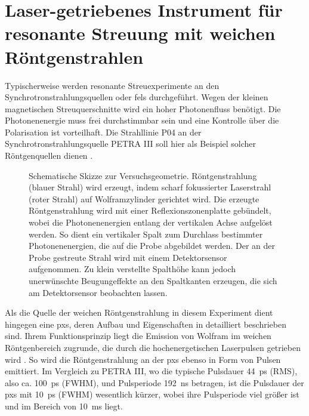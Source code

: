 \chapter{Laser-getriebenes Instrument für resonante Streuung mit weichen Röntgenstrahlen}
\label{text:quelle_roentgen}
Typischerweise werden resonante Streuexperimente an den Synchrotronstrahlungsquellen oder \gls{fel}s durchgeführt. Wegen der kleinen magnetischen Streuquerschnitte wird ein hoher Photonenfluss benötigt. Die Photonenenergie muss frei durchstimmbar sein und eine Kontrolle über die Polarisation ist vorteilhaft. Die Strahllinie P04 an der Synchrotronstrahlungsquelle PETRA III soll hier als Beispiel solcher Röntgenquellen dienen \cite{viefhaus_variable_2013}.
\begin{figure}[H]
    \centering
    
    \caption{Schematische Skizze zur Versuchsgeometrie. Röntgenstrahlung (blauer Strahl) wird erzeugt, indem scharf fokussierter Laserstrahl (roter Strahl) auf Wolframzylinder gerichtet wird. Die erzeugte Röntgenstrahlung wird mit einer Reflexionszonenplatte gebündelt, wobei die Photonenenergien entlang der vertikalen Achse aufgelöst werden. So dient ein vertikaler Spalt zum Durchlass bestimmter Photonenenergien, die auf die Probe abgebildet werden. Der an der Probe gestreute Strahl wird mit einem Detektorsensor aufgenommen. Zu klein verstellte Spalthöhe kann jedoch unerwünschte Beugungeffekte an den Spaltkanten erzeugen, die sich am Detektorsensor beobachten lassen.}
    \label{fig:pxs_aufbau}
\end{figure}
\noindent
Als die Quelle der weichen Röntgenstrahlung in diesem Experiment dient hingegen eine \gls{pxs}, deren Aufbau und Eigenschaften in \cite{schick_laser-driven_2021} detailliert beschrieben sind. Ihrem Funktionsprinzip liegt die Emission von Wolfram im weichen Röntgenbereich zugrunde, die durch die hochenergetischen Laserpulsen getrieben wird \cite{mantouvalou_high_2015}. So wird die Röntgenstrahlung an der \gls{pxs} ebenso in Form von Pulsen emittiert. Im Vergleich zu PETRA III, wo die typische Pulsdauer \SI{44}{\pico\second} (RMS), also ca. \SI{100}{\pico\second} (FWHM), und Pulsperiode \SI{192}{\nano\second}  betragen, ist die Pulsdauer der \gls{pxs} mit \SI{10}{\pico\second} (FWHM) wesentlich kürzer, wobei ihre Pulsperiode viel größer ist und im Bereich von \SI{10}{\milli\second} liegt.
